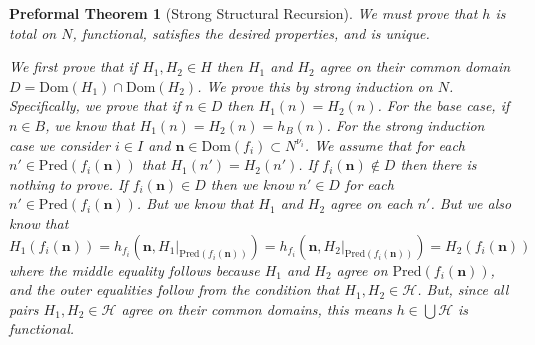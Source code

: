 \documentclass[oneside, 12pt]{book}
\theoremstyle{break}
\newtheorem{preformal definition}[definition]{Preformal Definition}
\newtheorem{preformal theorem}[theorem]{Preformal Theorem}
\newcommand{\bv}[1]{\boldsymbol{#1}}
\newcommand{\mc}[1]{\mathcal{#1}}
\begin{document}
\begin{preformal theorem}[Strong Structural Recursion]
				We must prove that $h$ is total on $N$, functional, satisfies the desired properties, and is unique.
				
				We first prove that if $H_1, H_2 \in H$ then $H_1$ and $H_2$ agree on their common domain $D = \text{Dom}(H_1) \cap \text{Dom}(H_2)$.
				We prove this by strong induction on $N$.
				Specifically, we prove that if $n\in D$ then $H_1(n) = H_2(n)$.
				For the base case, if $n\in B$, we know that $H_1(n) = H_2(n) = h_B(n)$.
				For the strong induction case we consider $i\in I$ and $\bv{n} \in \text{Dom}(f_i) \subset N^{\nu_i}$.
				We assume that for each $n' \in \text{Pred}(f_i(\bv{n}))$ that $H_1(n') = H_2(n')$.
				If $f_i(\bv{n}) \not \in D$ then there is nothing to prove.
				If $f_i(\bv{n}) \in D$ then we know $n'\in D$ for each $n' \in \text{Pred}(f_i(\bv{n}))$.
				But we know that $H_1$ and $H_2$ agree on each $n'$.
				But we also know that
				\begin{equation*}
					H_1(f_i(\bv{n})) = h_{f_i}(\bv{n}, H_1|_{\text{Pred}(f_i(\bv{n}))}) = h_{f_i}(\bv{n}, H_2|_{\text{Pred}(f_i(\bv{n}))}) = H_2(f_i(\bv{n}))
				\end{equation*}
				where the middle equality follows because $H_1$ and $H_2$ agree on $\text{Pred}(f_i(\bv{n}))$, and the outer equalities follow from the condition that $H_1, H_2 \in \mc{H}$.
				But, since all pairs $H_1, H_2 \in \mc{H}$ agree on their common domains, this means $h \in \bigcup \mc{H}$ is functional.
				

\end{preformal theorem}
\end{document}
